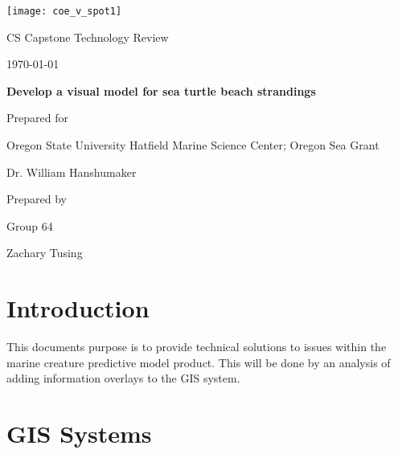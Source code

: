 \documentclass[onecolumn, draftclsnofoot,10pt, compsoc]{IEEEtran}
\def \CapstoneTeamName{     Beached Marine Critters Project Team}
\def \CapstoneTeamNumber{       64}
\def \GroupMemberFive{          Zachary Tusing}
\def \CapstoneProjectName{      Develop a visual model for sea turtle beach strandings}
\def \CapstoneSponsorCompany{   Oregon State University Hatfield Marine Science Center; Oregon Sea Grant}
\def \CapstoneSponsorPerson{        Dr. William Hanshumaker}
\def \DocType{      %
                Technology Review
                }
\newcommand{\NameSigPair}[1]{\par
\makebox[2.75in][r]{#1} \hfil   \makebox[3.25in]{\makebox[2.25in]{\hrulefill} \hfill        \makebox[.75in]{\hrulefill}}
\par\vspace{-12pt} \textit{\tiny\noindent
\makebox[2.75in]{} \hfil        \makebox[3.25in]{\makebox[2.25in][r]{Signature} \hfill  \makebox[.75in][r]{Date}}}}
\renewcommand{\NameSigPair}[1]{#1}
\begin{document}
\begin{titlepage}
    \begin{singlespace}
     \texttt{[image: coe\_v\_spot1]}
        \hfill 
        \par\vspace{.2in}
        \centering
        \scshape{
            \huge CS Capstone \DocType \par
            {\normalsize\today}\par
            \vspace{.5in}
            \textbf{\Huge\CapstoneProjectName}\par
            \vspace{1in}
            {\Large Prepared for}\par
            \huge \CapstoneSponsorCompany\par
            \vspace{5pt}
            {\Large\NameSigPair{\CapstoneSponsorPerson}\par}
            \vspace{.5in}
            {\large Prepared by }\par
            Group\CapstoneTeamNumber\par
            \vspace{5pt}
            {\Large
            \NameSigPair{\GroupMemberFive}\par
            }
            \vspace{20pt}
        }
        \vfill    
    \end{singlespace}
\end{titlepage}
\newpage

        
      \pagebreak
        \section{Introduction}
    This documents purpose is to provide technical solutions to issues within the marine creature predictive model product. This will be done by an analysis of adding information overlays to the GIS system.
      \section{GIS Systems}
\end{document}
